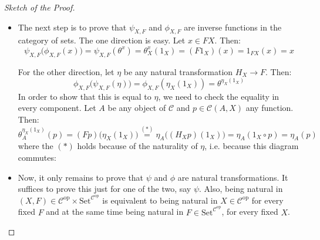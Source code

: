 \begin{proof}[Sketch of the Proof]
\begin{itemize}
The definition of $\phi$ is not over yet, since we have to prove that $\theta^x$ is indeed natural in $A$, i.e. that for every morphism $f^{\mathrm{op}}\in\mathcal{C}(A,B)$ the following diagram commutes:
\begin{center}
\end{center}
which does, since both directions take $q$ to $(F(q\circ f))(x)$.

\item The next step is to prove that $\psi_{X,F}$ and $\phi_{X,F}$ are inverse functions in the category of sets. The one direction is easy. Let $x\in FX$. Then:
\[\psi_{X,F}\big(\phi_{X,F}(x)\big)=\psi_{X,F}(\theta^x)=\theta^x_X(1_X)=(F1_X)(x)=1_{FX}(x)=x\]

For the other direction, let $\eta$ be any natural transformation $H_X\to F$. Then:
\[\phi_{X,F}\big(\psi_{X,F}(\eta)\big)=\phi_{X,F}(\eta_X(1_X))=\theta^{\eta_X(1_X)}\]
In order to show that this is equal to $\eta$, we need to check the equality in every component. Let $A$ be any object of $\mathcal{C}$ and $p\in\mathcal{C}(A,X)$ any function. Then:
\[\theta^{\eta_X(1_X)}_A(p)=(Fp)\big(\eta_X(1_X)\big)\overset{(*)}{=}\eta_A\big((H_Xp)(1_X)\big)=\eta_A(1_X\circ p)=\eta_A(p)\]
where the $(*)$ holds because of the naturality of $\eta$, i.e. because this diagram commutes:
\begin{center}
\end{center}

\item Now, it only remains to prove that $\psi$ and $\phi$ are natural transformations. It suffices to prove this just for one of the two, say $\psi$. Also, being natural in $(X,F)\in\mathcal{C}^{\mathrm{op}}\times\mathrm{Set}^{\mathcal{C}^{\mathrm{op}}}$ is equivalent to being natural in $X\in\mathcal{C}^{\mathrm{op}}$ for every fixed $F$ and at the same time being natural in $F\in\mathrm{Set}^{\mathcal{C}^{\mathrm{op}}}$, for every fixed $X$.


\end{itemize}
\end{proof}
